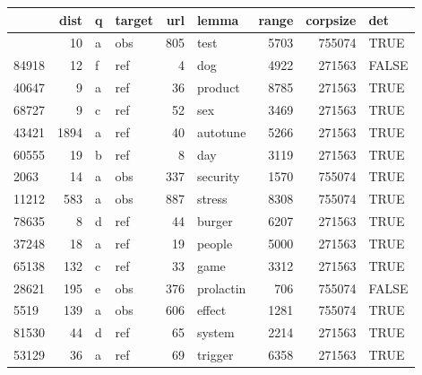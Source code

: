 \documentclass[]{tufte-handout}
\begin{document}
\begin{longtable}[]{@{}lrllrlrrl@{}}
\toprule\noalign{}
& dist & q & target & url & lemma & range & corpsize & det \\
\midrule\noalign{}
\endhead
\bottomrule\noalign{}
\endlastfoot
9650 & 10 & a & obs & 805 & test & 5703 & 755074 & TRUE \\
84918 & 12 & f & ref & 4 & dog & 4922 & 271563 & FALSE \\
40647 & 9 & a & ref & 36 & product & 8785 & 271563 & TRUE \\
68727 & 9 & c & ref & 52 & sex & 3469 & 271563 & TRUE \\
43421 & 1894 & a & ref & 40 & autotune & 5266 & 271563 & TRUE \\
60555 & 19 & b & ref & 8 & day & 3119 & 271563 & TRUE \\
2063 & 14 & a & obs & 337 & security & 1570 & 755074 & TRUE \\
11212 & 583 & a & obs & 887 & stress & 8308 & 755074 & TRUE \\
78635 & 8 & d & ref & 44 & burger & 6207 & 271563 & TRUE \\
37248 & 18 & a & ref & 19 & people & 5000 & 271563 & TRUE \\
65138 & 132 & c & ref & 33 & game & 3312 & 271563 & TRUE \\
28621 & 195 & e & obs & 376 & prolactin & 706 & 755074 & FALSE \\
5519 & 139 & a & obs & 606 & effect & 1281 & 755074 & TRUE \\
81530 & 44 & d & ref & 65 & system & 2214 & 271563 & TRUE \\
53129 & 36 & a & ref & 69 & trigger & 6358 & 271563 & TRUE \\
\end{longtable}
\end{document}
